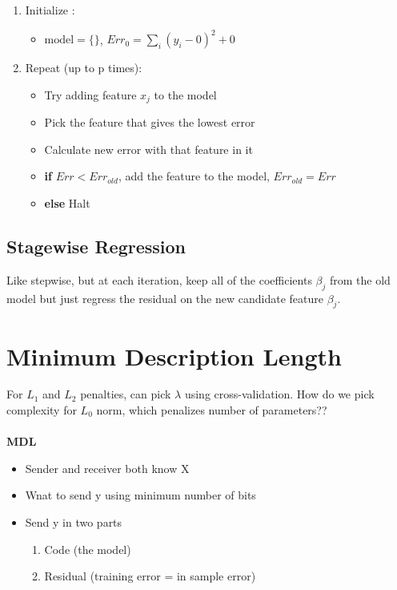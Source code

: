 \documentclass[a4paper]{article}\usepackage[]{graphicx}\usepackage[]{color}
\begin{document}
\begin{enumerate}
\item Initialize :
\begin{itemize}
\item $\text{model} = \{\}$, $Err_0 = \sum_i (y_i-0)^2 + 0$
\end{itemize}

\item Repeat (up to p times):
\begin{itemize}
\item Try adding feature $x_j$ to the model
\item Pick the feature that gives the lowest error
\item Calculate new error with that feature in it
\item \textbf{if} $Err < Err_{old}$, add the feature to the model, $Err_{old}=Err$
\item \textbf{else} Halt
\end{itemize}
\end{enumerate}

\subsection{Stagewise Regression}

Like stepwise, but at each iteration, keep all of the coefficients $\beta_j$ from the old model but just regress the residual on the new candidate feature $\beta_j$. 

\section{Minimum Description Length}

For $L_1$ and $L_2$ penalties, can pick $\lambda$ using cross-validation. How do we pick complexity for $L_0$ norm, which penalizes number of parameters?? \\
\\

\textbf{MDL}
\begin{itemize}
\item Sender and receiver both know X
\item Wnat to send y using minimum number of bits
\item Send y in two parts 
\begin{enumerate}
\item Code (the model)
\item Residual (training error = in sample error)
\end{enumerate}
\end{itemize}
\end{document}
